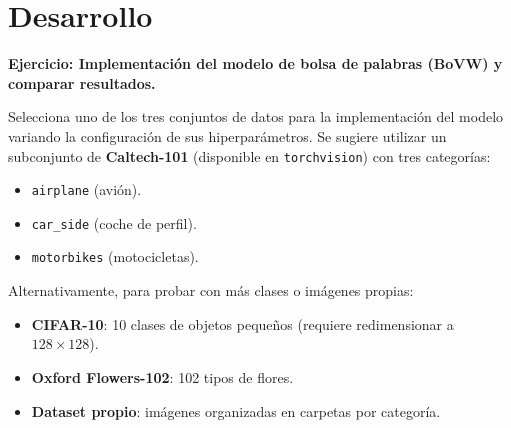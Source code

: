\documentclass{article}
\begin{document}
\section{Desarrollo}
\begin{large}
\textbf{Ejercicio: Implementación del modelo de bolsa de palabras (BoVW) y comparar resultados.}
\end{large}
\bigskip\noindent
Selecciona uno de los tres conjuntos de datos para la implementación del modelo variando la configuración de sus hiperparámetros. Se sugiere utilizar un subconjunto de \textbf{Caltech-101} (disponible en \texttt{torchvision}) con tres categorías:
\begin{itemize}
    \item \texttt{airplane} (avión).
    \item \texttt{car\_side} (coche de perfil).
    \item \texttt{motorbikes} (motocicletas).
\end{itemize}
Alternativamente, para probar con más clases o imágenes propias:
\begin{itemize}
    \item \textbf{CIFAR-10}: 10 clases de objetos pequeños (requiere redimensionar a $128\times128$).
    \item \textbf{Oxford Flowers-102}: 102 tipos de flores.
    \item \textbf{Dataset propio}: imágenes organizadas en carpetas por categoría.
\end{itemize}
\bigskip
\end{document}
